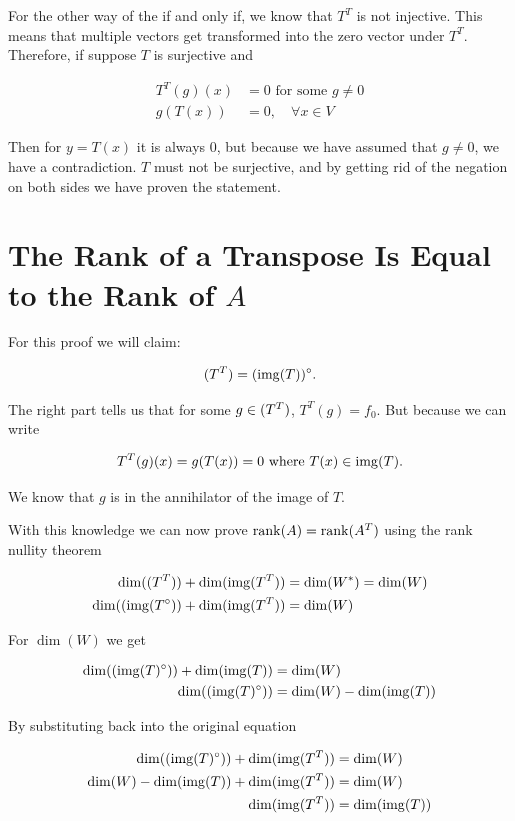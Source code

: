 For the other way of the if and only if, we know that \(T^T\) is not injective. This means that multiple vectors get transformed into the 
zero vector under \(T^T\). Therefore, if suppose \(T\) is surjective and 

\begin{align*}
    T^T(g)(x) &= 0 \text{ for some } g \ne 0\\ 
        g(T(x)) &= 0, \quad \forall x \in V 
\end{align*}

Then for \(y = T(x)\) it is always 0, but because we have assumed that \(g \ne 0\), we have a contradiction. \(T\) must not be surjective, 
and by getting rid of the negation on both sides we have proven the statement.

\QED

\section{The Rank of a Transpose Is Equal to the Rank of \texorpdfstring{\(A\)}{}}

For this proof we will claim:

\[
    \null(T^T) = (\img(T))^{\circ}.
\]

The right part tells us that for some \(g \in \null(T^T)\), \(T^T(g) = f_0\). But because we can write 

\[
    T^T(g)(x) = g(T(x)) = 0 \text{ where } T(x) \in \mathrm{img}(T).
\]

We know that \(g\) is in the annihilator of the image of \(T\). 

With this knowledge we can now prove \(\mathrm{rank}(A) = \mathrm{rank}(A^T)\) using the rank nullity theorem 

\begin{align*}
    \dim(\null(T^T)) + \dim(\img(T^T)) &= \dim(W^*) = \dim(W) \\ 
    \dim((\img(T^{\circ})) + \dim(\img(T^T)) &= \dim(W) \\ 
\end{align*}

For \(\dim(W)\) we get 

\begin{align*}
    \dim((\mathrm{img}(T)^{\circ})) + \dim(\mathrm{img}(T)) &=  \dim(W) \\  
    \dim((\mathrm{img}(T)^{\circ})) &=  \dim(W) - \dim(\mathrm{img}(T)) 
\end{align*}

By substituting back into the original equation 

\begin{align*} 
    \dim((\mathrm{img}(T)^{\circ})) + \dim(\mathrm{img}(T^T)) &= \dim(W) \\ 
    \dim(W) - \dim(\mathrm{img}(T))  + \dim(\mathrm{img}(T^T)) &= \dim(W)\\ 
    \dim(\mathrm{img}(T^T))  &=  \dim(\mathrm{img}(T))  
\end{align*}

\QED



